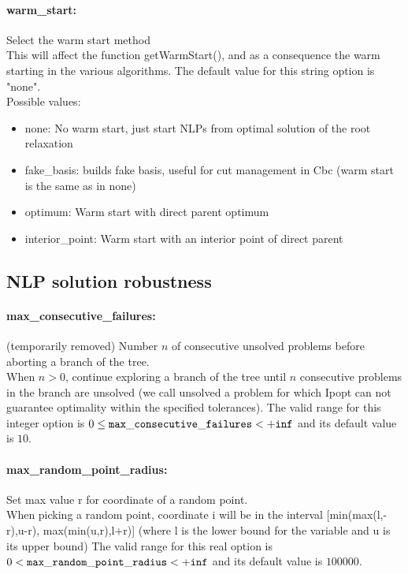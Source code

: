 \paragraph{warm\_start:}\label{opt:warm_start} Select the warm start method \\
 This will affect the function getWarmStart(), and as a consequence the warm starting in the various algorithms. The default value for this string option is "none".
\\ 
Possible values:
\begin{itemize}
   \item none: No warm start, just start NLPs from optimal solution of the root relaxation
   \item fake\_basis: builds fake basis, useful for cut management in Cbc (warm start is the same as in none)
   \item optimum: Warm start with direct parent optimum
   \item interior\_point: Warm start with an interior point of direct parent
\end{itemize}

\subsection{NLP solution robustness}
\label{sec:NLPsolutionrobustness}
\paragraph{max\_consecutive\_failures:}\label{opt:max_consecutive_failures} (temporarily removed) Number $n$ of consecutive unsolved problems before aborting a branch of the tree. \\
 When $n > 0$, continue exploring a branch of the tree until $n$ consecutive problems in the branch are unsolved (we call unsolved a problem for which Ipopt can not guarantee optimality within the specified tolerances). The valid range for this integer option is
$0 \le {\tt max\_consecutive\_failures } <  {\tt +inf}$
and its default value is $10$.


\paragraph{max\_random\_point\_radius:}\label{opt:max_random_point_radius} Set max value r for coordinate of a random point. \\
 When picking a random point, coordinate i will be in the interval [min(max(l,-r),u-r), max(min(u,r),l+r)] (where l is the lower bound for the variable and u is its upper bound) The valid range for this real option is 
$0 <  {\tt max\_random\_point\_radius } <  {\tt +inf}$
and its default value is $100000$.



